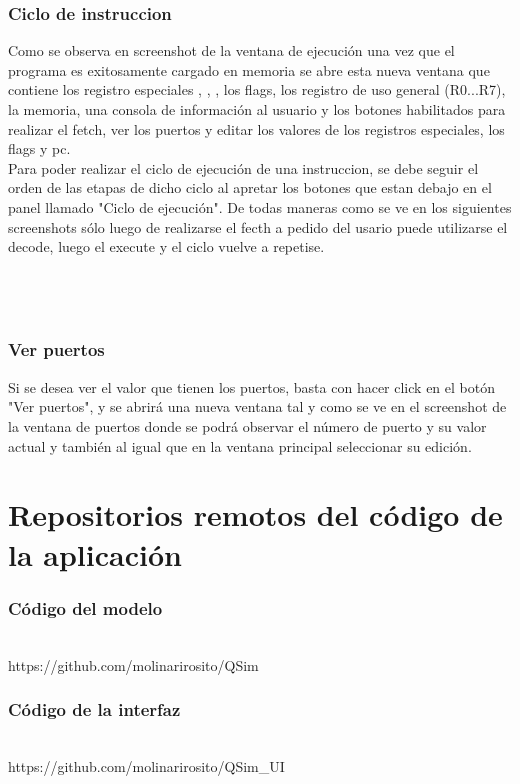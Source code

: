 \subsubsection{Ciclo de instruccion}
Como se observa en screenshot de la ventana de ejecución una vez que el programa es exitosamente cargado en memoria se abre esta nueva ventana que contiene los registro especiales \PC, \IR, \SP, los flags, los registro de uso general (R0...R7), la memoria, una consola de información al usuario y los botones habilitados para realizar el fetch, ver los puertos y editar los valores de los registros especiales, los flags y pc.
\\
Para poder realizar el ciclo de ejecución de una instruccion, se debe seguir el orden de las etapas de dicho ciclo al apretar los botones que estan debajo en el panel llamado "Ciclo de ejecución". De todas maneras como se ve en los siguientes screenshots sólo luego de realizarse el fecth a pedido del usario puede utilizarse el decode, luego el execute y el ciclo vuelve a repetise.\\

\\
\\
\\

\subsubsection{Ver puertos}
Si se desea ver el valor que tienen los puertos, basta con hacer click en el botón "Ver puertos", y se abrirá una nueva ventana tal y como se ve en el screenshot de la ventana de puertos donde se podrá observar el número de puerto y su valor actual y también al igual que en la ventana principal seleccionar su edición.
\\


\section{Repositorios remotos del código de la aplicación}

\subsubsection{Código del modelo}\\
https://github.com/molinarirosito/QSim

\subsubsection{Código de la interfaz}\\
https://github.com/molinarirosito/QSim_UI